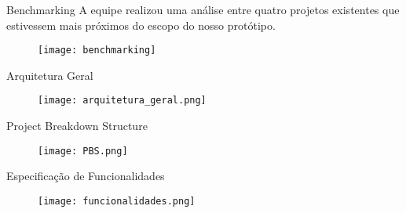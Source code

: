 \begin{frame}[t]{Benchmarking}
 A equipe realizou uma análise entre quatro projetos existentes que estivessem mais próximos do escopo do nosso protótipo.
    \begin{figure}
        \texttt{[image: benchmarking]}
    \end{figure}
    \vspace{1cm}

\end{frame}

\begin{frame}[t]{Arquitetura Geral}
    \begin{figure}
        \texttt{[image: arquitetura\_geral.png]}
    \end{figure}
\end{frame}

\begin{frame}[t]{Project Breakdown Structure}
    \vspace{0.5cm}
    \begin{figure}
        \texttt{[image: PBS.png]}
    \end{figure}
\end{frame}

\begin{frame}[t]{Especificação de Funcionalidades}
    \begin{figure}
        \texttt{[image: funcionalidades.png]}
    \end{figure}
\end{frame}
